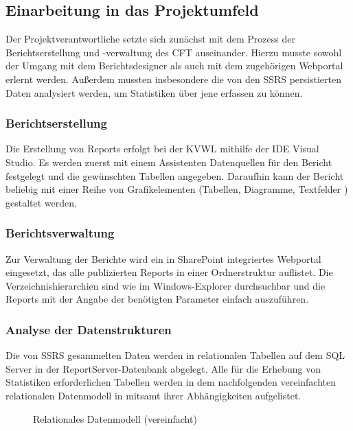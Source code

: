 \subsection{Einarbeitung in das Projektumfeld}
\label{sec:Einarbeitung}
Der Projektverantwortliche \autorName\xspace setzte sich zunächst mit dem Prozess der Berichts\-erstellung und -verwaltung des \ac{CFT} \teamName auseinander. Hierzu musste sowohl der Umgang mit dem Berichtsdesigner als auch mit dem zugehörigen Webportal erlernt werden. Außerdem mussten insbesondere die von den \ac{SSRS} persistierten Daten analysiert werden, um Statistiken über jene erfassen zu können.

\subsubsection{Berichtserstellung}
\label{sec:Berichtserstellung}
Die Erstellung von Reports erfolgt bei der \ac{KVWL} mithilfe der \ac{IDE} Visual Studio. Es werden zuerst mit einem Assistenten Datenquellen für den Bericht festgelegt und die gewünschten Tabellen angegeben. Daraufhin kann der Bericht beliebig mit einer Reihe von Grafikelementen (Tabellen, Diagramme, Textfelder \etc) gestaltet werden.

\subsubsection{Berichtsverwaltung}
\label{sec:Berichtsverwaltung}
Zur Verwaltung der Berichte wird ein in SharePoint integriertes Webportal eingesetzt, das alle publizierten Reports in einer Ordnerstruktur auflistet. Die Verzeichnishierarchien sind wie im Windows-Explorer durchsuchbar und die Reports mit der Angabe der benötigten Parameter einfach auszuführen.

\subsubsection{Analyse der Datenstrukturen}
\label{sec:Datenstrukturen}
Die von \ac{SSRS} gesammelten Daten werden in relationalen Tabellen auf dem SQL Server in der ReportServer-Datenbank abgelegt. Alle für die Erhebung von Statistiken erforderlichen Tabellen werden in dem nachfolgenden vereinfachten relationalen Datenmodell in  mitsamt ihrer Abhängigkeiten aufgelistet.
\begin{figure}[htb]
	\centering
	\caption{Relationales Datenmodell (vereinfacht)}
	\label{fig:Datenmodell}
\end{figure}

